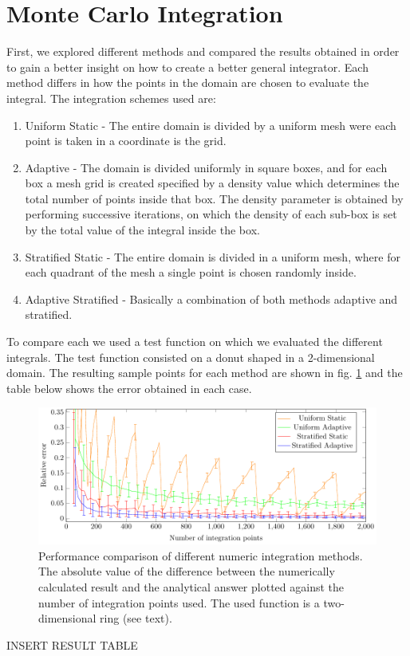 

\section{Monte Carlo Integration}

First, we explored different methods and compared the results obtained
in order to gain a better insight on how to create a better general integrator. Each method differs in how
the points in the domain are chosen to evaluate the integral.
The integration schemes \cite{MCmethods} used are:
\begin{enumerate}
  \item Uniform Static - The entire domain is divided by a uniform mesh were each point is taken in a coordinate is the grid.
  \item Adaptive - The domain is divided uniformly in square boxes, and for each box a mesh grid is created
  specified by a density value which determines the total number of points inside that box. The density parameter
  is obtained by performing successive iterations, on which the density of each sub-box is set by the total value of the integral inside
  the box.
  \item Stratified Static - The entire domain is divided in a uniform mesh, where for each quadrant of the mesh
  a single point is chosen randomly inside.
  \item Adaptive Stratified - Basically a combination of both methods adaptive and stratified.
\end{enumerate}

To compare each we used a test function on which we evaluated the different integrals.
The test function consisted on a donut shaped  in a 2-dimensional domain. The resulting
sample points for each method are shown in fig. \ref{} and the table below shows the error
obtained in each case.

\begin{figure}[ht]
  \begin{center}
  \includegraphics[scale=1 ]{graphs/integration_test_ring.pdf}
  \caption{Performance comparison of different numeric integration methods. The absolute value of the difference between the numerically calculated result and the analytical answer plotted against the number of integration points used. The used function is a two-dimensional ring (see text).}
  \label{fig:int}
  \end{center}
\end{figure}

INSERT RESULT TABLE
